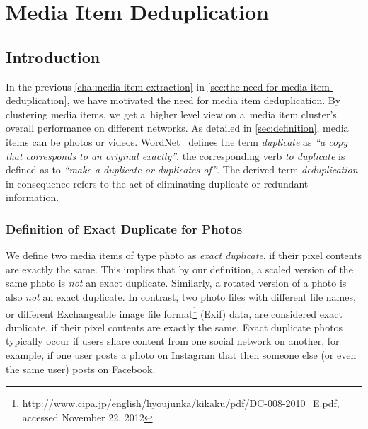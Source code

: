 \chapter{Media Item Deduplication}
\label{sec:media-item-deduplication}

\ifpdf
    \graphicspath{{6_media_item_deduplication/figures/PNG/}{6_media_item_deduplication/figures/PDF/}{6_media_item_deduplication/figures/}}
\else
    \graphicspath{{6_media_item_deduplication/figures/EPS/}{6_media_item_deduplication/figures/}}
\fi

\section{Introduction}

In the previous \autoref{cha:media-item-extraction}
in \autoref{sec:the-need-for-media-item-deduplication},
we have motivated the need for media item deduplication.
By clustering media items, we get a~higher level view on
a~media item cluster's overall performance on different networks.
As detailed in \autoref{sec:definition}, media items can be
photos or videos.
WordNet~\cite{fellbaum1998wordnet,miller1995wordnet} defines
the term \emph{duplicate} as
\textit{``a copy that corresponds to an original exactly''}.
the corresponding verb \emph{to duplicate} is defined as to
\textit{``make a duplicate or duplicates of''}.
The derived term \emph{deduplication} in consequence refers to
the act of eliminating duplicate or redundant information.

\subsection{Definition of Exact Duplicate for Photos}

We define two media items of type photo as \emph{exact duplicate},
if their pixel contents are exactly the same.
This implies that by our definition, a scaled version
of the same photo is \emph{not} an exact duplicate. 
Similarly, a rotated version of a photo is also \emph{not}
an exact duplicate. 
In contrast, two photo files with different file names,
or different Exchangeable image file
format\footnote{\url{http://www.cipa.jp/english/hyoujunka/kikaku/pdf/DC-008-2010_E.pdf},
accessed November 22, 2012}
(Exif) data, are considered exact duplicate,
if their pixel contents are exactly the same.
Exact duplicate photos typically occur if users share content 
from one social network on another, for example,
if one user posts a photo on Instagram that then someone else
(or even the same user) posts on Facebook.

